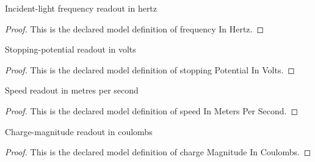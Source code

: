 \begin{definition}
  \label{def:physics:phyx-mini-0516:phyxminiproblems-problemphyxmini0516-frequencyinhertz}
  Incident-light frequency readout in hertz
\end{definition}
\begin{proof}
  This is the declared model definition of frequency In Hertz.
\end{proof}
\begin{definition}
  \label{def:physics:phyx-mini-0516:phyxminiproblems-problemphyxmini0516-stoppingpotentialinvolts}
  Stopping-potential readout in volts
\end{definition}
\begin{proof}
  This is the declared model definition of stopping Potential In Volts.
\end{proof}
\begin{definition}
  \label{def:physics:phyx-mini-0516:phyxminiproblems-problemphyxmini0516-speedinmeterspersecond}
  Speed readout in metres per second
\end{definition}
\begin{proof}
  This is the declared model definition of speed In Meters Per Second.
\end{proof}
\begin{definition}
  \label{def:physics:phyx-mini-0516:phyxminiproblems-problemphyxmini0516-chargemagnitudeincoulombs}
  Charge-magnitude readout in coulombs
\end{definition}
\begin{proof}
  This is the declared model definition of charge Magnitude In Coulombs.
\end{proof}
